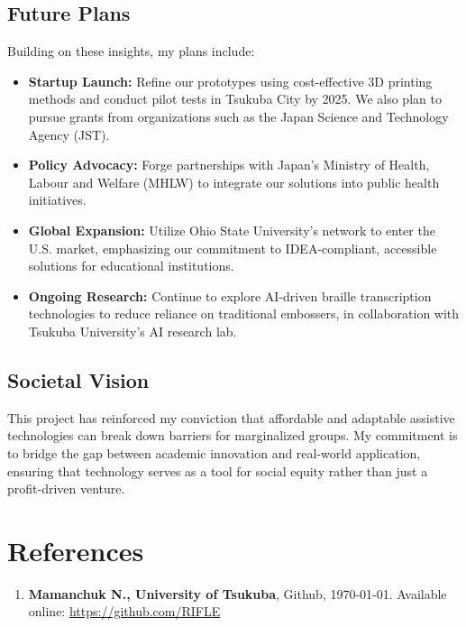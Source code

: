 \documentclass[12pt,a4paper]{article}
\begin{document}
\subsection{Future Plans}
Building on these insights, my plans include:
\begin{itemize}[leftmargin=*, label=\textbullet]
    \item \textbf{Startup Launch:} Refine our prototypes using cost-effective 3D printing methods and conduct pilot tests in Tsukuba City by 2025. We also plan to pursue grants from organizations such as the Japan Science and Technology Agency (JST).
    \item \textbf{Policy Advocacy:} Forge partnerships with Japan's Ministry of Health, Labour and Welfare (MHLW) to integrate our solutions into public health initiatives.
    \item \textbf{Global Expansion:} Utilize Ohio State University's network to enter the U.S. market, emphasizing our commitment to IDEA-compliant, accessible solutions for educational institutions.
    \item \textbf{Ongoing Research:} Continue to explore AI-driven braille transcription technologies to reduce reliance on traditional embossers, in collaboration with Tsukuba University's AI research lab.
\end{itemize}

\subsection{Societal Vision}
This project has reinforced my conviction that affordable and adaptable assistive technologies can break down barriers for marginalized groups. My commitment is to bridge the gap between academic innovation and real-world application, ensuring that technology serves as a tool for social equity rather than just a profit-driven venture.

\section*{References}
\begin{enumerate}
    \item \textbf{Mamanchuk N., University of Tsukuba}, Github, \today. Available online: \url{https://github.com/RIFLE}
\end{enumerate}
\end{document}
